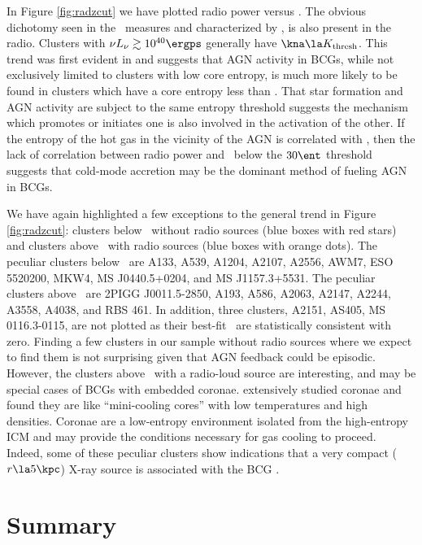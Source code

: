 \documentclass{emulateapj}
\begin{document}
In Figure \ref{fig:radzcut} we have plotted radio power versus \kna.
The obvious dichotomy seen in the \halpha\ measures and characterized
by \kthr, is also present in the radio. Clusters with $\nu L_{\nu}
\gtrsim 10^{40} \ergps$ generally have $\kna \la \kthr$. This trend
was first evident in \citet{radioquiet} and suggests that AGN activity
in BCGs, while not exclusively limited to clusters with low core
entropy, is much more likely to be found in clusters which have a core
entropy less than \kthr. That star formation and AGN activity are
subject to the same entropy threshold suggests the mechanism which
promotes or initiates one is also involved in the activation of the
other. If the entropy of the hot gas in the vicinity of the AGN is
correlated with \kna, then the lack of correlation between radio power
and \kna\ below the $30 \ent$ threshold suggests that cold-mode
accretion \citep{pizzolato05, hardcastle07} may be the dominant method
of fueling AGN in BCGs.

We have again highlighted a few exceptions to the general trend in
Figure \ref{fig:radzcut}: clusters below \kthr\ without radio sources
(blue boxes with red stars) and clusters above \kthr\ with radio
sources (blue boxes with orange dots). The peculiar clusters below
\kthr\ are A133, A539, A1204, A2107, A2556, AWM7, ESO 5520200, MKW4,
MS J0440.5+0204, and MS J1157.3+5531. The peculiar clusters above
\kthr\ are 2PIGG J0011.5-2850, A193, A586, A2063, A2147, A2244, A3558,
A4038, and RBS 461. In addition, three clusters, A2151, AS405, MS
0116.3-0115, are not plotted as their best-fit \kna\ are statistically
consistent with zero. Finding a few clusters in our sample without
radio sources where we expect to find them is not surprising given
that AGN feedback could be episodic. However, the clusters above
\kthr\ with a radio-loud source are interesting, and may be special
cases of BCGs with embedded coronae. \cite{coronae} extensively
studied coronae and found they are like ``mini-cooling cores'' with
low temperatures and high densities. Coronae are a low-entropy
environment isolated from the high-entropy ICM and may provide the
conditions necessary for gas cooling to proceed. Indeed, some of these
peculiar clusters show indications that a very compact ($r \la 5\kpc$)
X-ray source is associated with the BCG \citep{accept}.

\section{Summary}
\label{sec:diss}
\end{document}
